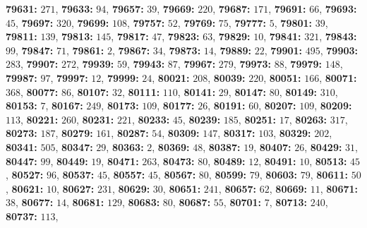\textsf{\bfseries 79631:} $271$, \textsf{\bfseries 79633:} $94$, \textsf{\bfseries 79657:} $39$, \textsf{\bfseries 79669:} $220$, \textsf{\bfseries 79687:} $171$, \textsf{\bfseries 79691:} $66$, \textsf{\bfseries 79693:} $45$, \textsf{\bfseries 79697:} $320$, \textsf{\bfseries 79699:} $108$, \textsf{\bfseries 79757:} $52$, \textsf{\bfseries 79769:} $75$, \textsf{\bfseries 79777:} $5$, \textsf{\bfseries 79801:} $39$, \textsf{\bfseries 79811:} $139$, \textsf{\bfseries 79813:} $145$, \textsf{\bfseries 79817:} $47$, \textsf{\bfseries 79823:} $63$, \textsf{\bfseries 79829:} $10$, \textsf{\bfseries 79841:} $321$, \textsf{\bfseries 79843:} $99$, \textsf{\bfseries 79847:} $71$, \textsf{\bfseries 79861:} $2$, \textsf{\bfseries 79867:} $34$, \textsf{\bfseries 79873:} $14$, \textsf{\bfseries 79889:} $22$, \textsf{\bfseries 79901:} $495$, \textsf{\bfseries 79903:} $283$, \textsf{\bfseries 79907:} $272$, \textsf{\bfseries 79939:} $59$, \textsf{\bfseries 79943:} $87$, \textsf{\bfseries 79967:} $279$, \textsf{\bfseries 79973:} $88$, \textsf{\bfseries 79979:} $148$, \textsf{\bfseries 79987:} $97$, \textsf{\bfseries 79997:} $12$, \textsf{\bfseries 79999:} $24$, \textsf{\bfseries 80021:} $208$, \textsf{\bfseries 80039:} $220$, \textsf{\bfseries 80051:} $166$, \textsf{\bfseries 80071:} $368$, \textsf{\bfseries 80077:} $86$, \textsf{\bfseries 80107:} $32$, \textsf{\bfseries 80111:} $110$, \textsf{\bfseries 80141:} $29$, \textsf{\bfseries 80147:} $80$, \textsf{\bfseries 80149:} $310$, \textsf{\bfseries 80153:} $7$, \textsf{\bfseries 80167:} $249$, \textsf{\bfseries 80173:} $109$, \textsf{\bfseries 80177:} $26$, \textsf{\bfseries 80191:} $60$, \textsf{\bfseries 80207:} $109$, \textsf{\bfseries 80209:} $113$, \textsf{\bfseries 80221:} $260$, \textsf{\bfseries 80231:} $221$, \textsf{\bfseries 80233:} $45$, \textsf{\bfseries 80239:} $185$, \textsf{\bfseries 80251:} $17$, \textsf{\bfseries 80263:} $317$, \textsf{\bfseries 80273:} $187$, \textsf{\bfseries 80279:} $161$, \textsf{\bfseries 80287:} $54$, \textsf{\bfseries 80309:} $147$, \textsf{\bfseries 80317:} $103$, \textsf{\bfseries 80329:} $202$, \textsf{\bfseries 80341:} $505$, \textsf{\bfseries 80347:} $29$, \textsf{\bfseries 80363:} $2$, \textsf{\bfseries 80369:} $48$, \textsf{\bfseries 80387:} $19$, \textsf{\bfseries 80407:} $26$, \textsf{\bfseries 80429:} $31$, \textsf{\bfseries 80447:} $99$, \textsf{\bfseries 80449:} $19$, \textsf{\bfseries 80471:} $263$, \textsf{\bfseries 80473:} $80$, \textsf{\bfseries 80489:} $12$, \textsf{\bfseries 80491:} $10$, \textsf{\bfseries 80513:} $45$, \textsf{\bfseries 80527:} $96$, \textsf{\bfseries 80537:} $45$, \textsf{\bfseries 80557:} $45$, \textsf{\bfseries 80567:} $80$, \textsf{\bfseries 80599:} $79$, \textsf{\bfseries 80603:} $79$, \textsf{\bfseries 80611:} $50$, \textsf{\bfseries 80621:} $10$, \textsf{\bfseries 80627:} $231$, \textsf{\bfseries 80629:} $30$, \textsf{\bfseries 80651:} $241$, \textsf{\bfseries 80657:} $62$, \textsf{\bfseries 80669:} $11$, \textsf{\bfseries 80671:} $38$, \textsf{\bfseries 80677:} $14$, \textsf{\bfseries 80681:} $129$, \textsf{\bfseries 80683:} $80$, \textsf{\bfseries 80687:} $55$, \textsf{\bfseries 80701:} $7$, \textsf{\bfseries 80713:} $240$, \textsf{\bfseries 80737:} $113$, 
